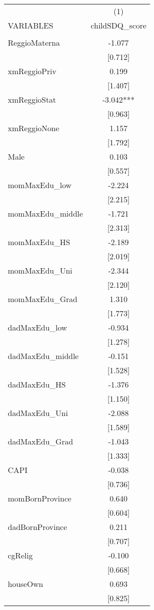 \documentclass[]{article}
\begin{document}
\begin{tabular}{lc} \hline
 & (1) \\
VARIABLES & childSDQ\_score \\ \hline
 &  \\
ReggioMaterna & -1.077 \\
 & [0.712] \\
xmReggioPriv & 0.199 \\
 & [1.407] \\
xmReggioStat & -3.042*** \\
 & [0.963] \\
xmReggioNone & 1.157 \\
 & [1.792] \\
Male & 0.103 \\
 & [0.557] \\
momMaxEdu\_low & -2.224 \\
 & [2.215] \\
momMaxEdu\_middle & -1.721 \\
 & [2.313] \\
momMaxEdu\_HS & -2.189 \\
 & [2.019] \\
momMaxEdu\_Uni & -2.344 \\
 & [2.120] \\
momMaxEdu\_Grad & 1.310 \\
 & [1.773] \\
dadMaxEdu\_low & -0.934 \\
 & [1.278] \\
dadMaxEdu\_middle & -0.151 \\
 & [1.528] \\
dadMaxEdu\_HS & -1.376 \\
 & [1.150] \\
dadMaxEdu\_Uni & -2.088 \\
 & [1.589] \\
dadMaxEdu\_Grad & -1.043 \\
 & [1.333] \\
CAPI & -0.038 \\
 & [0.736] \\
momBornProvince & 0.640 \\
 & [0.604] \\
dadBornProvince & 0.211 \\
 & [0.707] \\
cgRelig & -0.100 \\
 & [0.668] \\
houseOwn & 0.693 \\
 & [0.825] \\

\end{tabular}
\end{document}
